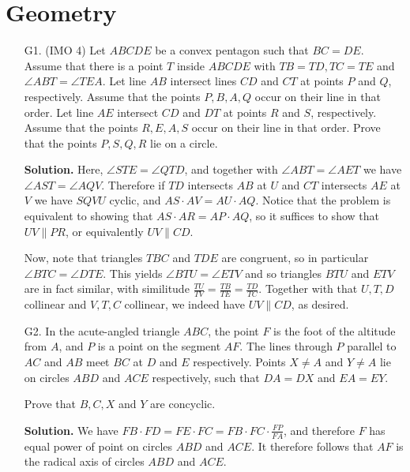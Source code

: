 \documentclass[11pt,a4paper]{article}
\begin{document}
    \section*{Geometry}
    \begin{enumerate}
    	\item [G1.] (IMO 4)
    	Let $ABCDE$ be a convex pentagon such that $BC=DE$. Assume that there is a point $T$ inside $ABCDE$ with $TB=TD,TC=TE$ and $\angle ABT = \angle TEA$. Let line $AB$ intersect lines $CD$ and $CT$ at points $P$ and $Q$, respectively. Assume that the points $P,B,A,Q$ occur on their line in that order. Let line $AE$ intersect $CD$ and $DT$ at points $R$ and $S$, respectively. Assume that the points $R,E,A,S$ occur on their line in that order. Prove that the points $P,S,Q,R$ lie on a circle.
    	
    	\textbf{Solution.} 
    	Here, $\angle STE = \angle QTD$, and together with $\angle ABT = \angle AET$ we have 
    	$\angle AST = \angle AQV$. 
    	Therefore if $TD$ intersects $AB$ at $U$ and $CT$ intersects $AE$ at $V$ we have $SQVU$ cyclic, 
    	and $AS\cdot AV = AU\cdot AQ$. 
    	Notice that the problem is equivalent to showing that $AS\cdot AR = AP\cdot AQ$, 
    	so it suffices to show that $UV\parallel PR$, or equivalently $UV\parallel CD$. 
    	
    	Now, note that triangles $TBC$ and $TDE$ are congruent, 
    	so in particular $\angle BTC = \angle DTE$. 
    	This yields $\angle BTU = \angle ETV$ and so triangles $BTU$ and $ETV$ are in fact similar, 
    	with similitude $\frac{TU}{TV}=\frac{TB}{TE} = \frac{TD}{TC}$. 
    	Together with that $U, T, D$ collinear and $V, T, C$ collinear, we indeed have $UV\parallel CD$, 
    	as desired. 
    	
    	\item [G2.]
    	In the acute-angled triangle $ABC$, 
    	the point $F$ is the foot of the altitude from $A$, 
    	and $P$ is a point on the segment $AF$. 
    	The lines through $P$ parallel to $AC$ and $AB$ meet $BC$ at $D$ and $E$ respectively. 
    	Points $X \neq A$ and $Y \neq A$ lie on circles $ABD$ and $ACE$ respectively, 
    	such that $DA = DX$ and $EA = EY$. 
    	
    	Prove that $B, C, X$ and $Y$ are concyclic.
    	
    	\textbf{Solution.} 
    	We have $FB\cdot FD = FE\cdot FC = FB\cdot FC\cdot \frac{FP}{FA}$, 
    	and therefore $F$ has equal power of point on circles $ABD$ and $ACE$. 
    	It therefore follows that $AF$ is the radical axis of circles $ABD$ and $ACE$. 
    	

\end{enumerate}
\end{document}
